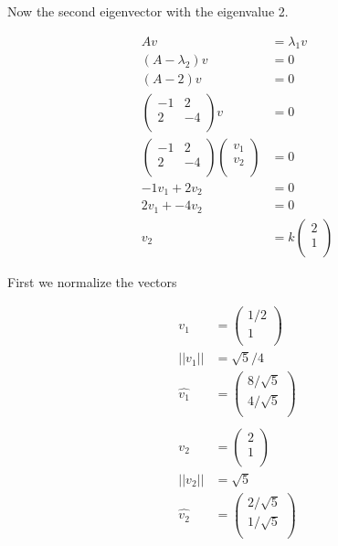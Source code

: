 \documentclass[
]{article}
\begin{document}
Now the second eigenvector with the eigenvalue 2.

\begin{align*}
Av &= \lambda_1v\\
(A - \lambda_2)v &= 0 \\
(A- 2)v &= 0 \\
\begin{pmatrix}
-1 & 2 \\
2 & -4 \\
\end{pmatrix} v &= 0\\
\begin{pmatrix}
-1 & 2 \\
2 & -4 \\
\end{pmatrix} \begin{pmatrix}
v_1 \\
v_2 \\
\end{pmatrix} &= 0\\

-1v_1 + 2v_2 &= 0\\
2v_1 + -4v_2 &= 0 \\

v_2 &= k \begin{pmatrix}
2 \\
1 \\
\end{pmatrix}
\end{align*}

First we normalize the vectors

\begin{align*}
v_1 &= \begin{pmatrix}
1/2 \\
1 \\
\end{pmatrix}\\
||v_1|| &= \sqrt{5}/4 \\ 
\hat{v_1} &= \begin{pmatrix}
8/\sqrt{5}\\
4/\sqrt{5}\\
\end{pmatrix}\\
\\

v_2 &= \begin{pmatrix}
2 \\
1 \\
\end{pmatrix}\\

||v_2|| &= \sqrt{5}\\
\hat{v_2} &= \begin{pmatrix}
2/\sqrt{5}\\
1/\sqrt{5}\\
\end{pmatrix}
\end{align*}
\end{document}

